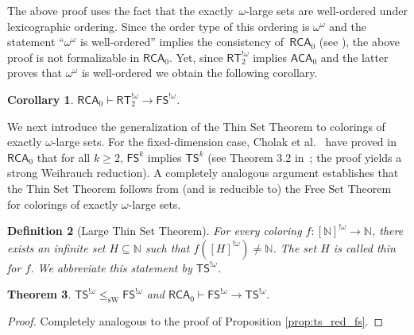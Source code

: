 \documentclass{article}
\newcommand{\RCA}[0]{\mathsf{RCA}}
\newcommand{\ACA}[0]{\mathsf{ACA}}
\newcommand{\FS}[0]{\mathsf{FS}}
\newcommand{\TS}[0]{\mathsf{TS}}
\newcommand{\RT}[0]{\mathsf{RT}}
\newcommand{\NN}[0]{\mathbb{N}}
\newcommand{\sW}{\mathrm{sW}}
\def\qt#1{``#1''}%
\newtheorem{theorem}{Theorem}
\numberwithin{theorem}{section}
\newtheorem{definition}[theorem]{Definition}
\newtheorem{corollary}[theorem]{Corollary}
\newcommand{\ludovic}[1]{\textcolor{blue}{#1}}
\newcommand{\lorenzo}[1]{\textcolor{orange}{#1}}
\begin{document}
The above proof uses the fact that the exactly~$\omega$-large sets are well-ordered under lexicographic ordering. Since the order type of this ordering is $\omega^\omega$ and the statement \qt{$\omega^\omega$ is well-ordered} implies the consistency of~$\RCA_0$ (see \cite{gentzen1967wiederspruchsfreiheit,hajek1998metamathematics}), the above proof is not formalizable in $\RCA_0$. Yet, since $\RT^{!\omega}_2$ implies $\ACA_0$ and the latter proves that $\omega^\omega$ is well-ordered we obtain the following corollary.

\begin{corollary}\label{cor:RTtoFS}
    $\RCA_0 \vdash \RT^{!\omega}_2 \to \FS^{!\omega}$.
\end{corollary}


We next introduce the generalization of the Thin Set Theorem to colorings of exactly $\omega$-large sets. For the fixed-dimension case, Cholak et al.~\cite{Cholak_Giusto_Hirst_Jockusch_2005} have proved in $\RCA_0$ that for all $k\geq 2$, $\FS^k$ implies $\TS^k$ %
(see Theorem 3.2 in~\cite{Cholak_Giusto_Hirst_Jockusch_2005}; the proof yields a strong Weihrauch reduction). A completely analogous argument establishes that the Thin Set Theorem follows from (and is reducible to) the Free Set Theorem for colorings of exactly $\omega$-large sets. 

\begin{definition}[Large Thin Set Theorem]\label{thm:thin}
For every coloring $f:[\NN]^{!\omega} \to \NN$, there exists an infinite set $H\subseteq \NN$ such that $f([H]^{!\omega}) \neq \NN$. The set $H$ is called \emph{thin} for $f$. We abbreviate this statement by $\TS^{!\omega}$.
\end{definition}


\begin{theorem}\label{thm:thin-sw-fs-omega}
$\TS^{!\omega} \leq_{\sW} \FS^{!\omega}$ and $\RCA_0 \vdash \FS^{!\omega}\to \TS^{!\omega}.$
\end{theorem}

\begin{proof} Completely analogous to the proof of Proposition \ref{prop:ts_red_fs}.

\end{proof}
\end{document}
